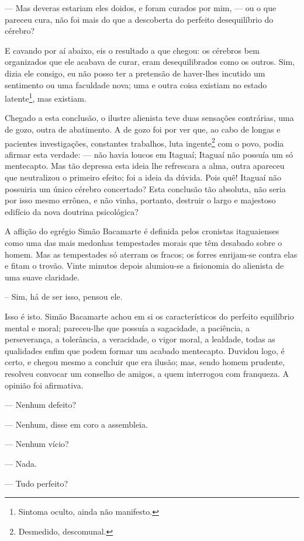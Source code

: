 --- Mas deveras estariam eles doidos, e foram curados por mim, --- ou o
que pareceu cura, não foi mais do que a descoberta do perfeito
desequilíbrio do cérebro?

E cavando por aí abaixo, eis o resultado a que chegou: os cérebros bem
organizados que ele acabava de curar, eram desequilibrados como os
outros. Sim, dizia ele consigo, eu não posso ter a pretensão de
haver-lhes incutido um sentimento ou uma faculdade nova; uma e outra
coisa existiam no estado latente\footnote{Sintoma oculto, ainda não
  manifesto.}, mas existiam.

Chegado a esta conclusão, o ilustre alienista teve duas sensações
contrárias, uma de gozo, outra de abatimento. A de gozo foi por ver que,
ao cabo de longas e pacientes investigações, constantes trabalhos, luta
ingente\footnote{Desmedido, descomunal.} com o povo, podia afirmar esta
verdade: --- não havia loucos em Itaguaí; Itaguaí não possuía um só
mentecapto. Mas tão depressa esta ideia lhe refrescara a alma, outra
apareceu que neutralizou o primeiro efeito; foi a ideia da dúvida. Pois
quê! Itaguaí não possuiria um único cérebro concertado? Esta conclusão
tão absoluta, não seria por isso mesmo errônea, e não vinha, portanto,
destruir o largo e majestoso edifício da nova doutrina psicológica?

A aflição do egrégio Simão Bacamarte é definida pelos cronistas
itaguaienses como uma das mais medonhas tempestades morais que têm
desabado sobre o homem. Mas as tempestades só aterram os fracos; os
forres enrijam-se contra elas e fitam o trovão. Vinte minutos depois
alumiou-se a fisionomia do alienista de uma suave claridade.

-- Sim, há de ser isso, pensou ele.

Isso é isto. Simão Bacamarte achou em si os característicos do perfeito
equilíbrio mental e moral; pareceu-lhe que possuía a sagacidade, a
paciência, a perseverança, a tolerância, a veracidade, o vigor moral, a
lealdade, todas as qualidades enfim que podem formar um acabado
mentecapto. Duvidou logo, é certo, e chegou mesmo a concluir que era
ilusão; mas, sendo homem prudente, resolveu convocar um conselho de
amigos, a quem interrogou com franqueza. A opinião foi afirmativa.

--- Nenhum defeito?

--- Nenhum, disse em coro a assembleia.

--- Nenhum vício?

--- Nada.

--- Tudo perfeito?

